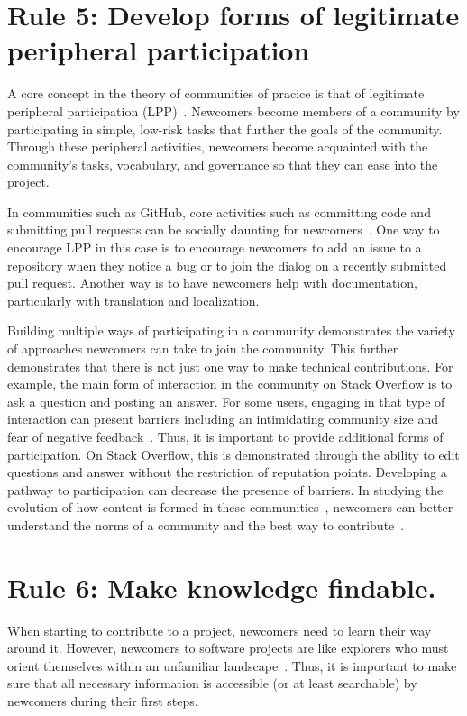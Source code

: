 \documentclass[10pt,letterpaper]{article}
\newcommand{\rulemajor}[1]{\section*{#1}}
\begin{document}
\rulemajor{Rule 5: Develop forms of legitimate peripheral participation}

A core concept in the theory of communities of pracice is that of
legitimate peripheral participation (LPP)~\cite{lave1991,wenger1999}.
Newcomers become members of a community by participating in simple, low-risk tasks
that further the goals of the community.
Through these peripheral activities,
newcomers become acquainted with the community's tasks, vocabulary, and governance
so that they can ease into the project.

In communities such as GitHub,
core activities such as committing code and submitting pull requests can be socially daunting for newcomers~\cite{steinmacher2015}.
One way to encourage LPP in this case is to encourage newcomers to add an issue to a repository when they notice a bug
or to join the dialog on a recently submitted pull request.
Another way is to have newcomers help with documentation,
particularly with translation and localization.

Building multiple ways of participating in a community demonstrates the variety of approaches newcomers can take to join the community.
This further demonstrates that there is not just one way to make technical contributions.
For example,
the main form of interaction in the community on Stack Overflow is to ask a question and posting an answer.
For some users,
engaging in that type of interaction can present barriers including an intimidating community size and fear of negative feedback~\cite{ford2016}.
Thus, it is important to provide additional forms of participation.
On Stack Overflow, this is demonstrated through the ability to edit questions and answer without the restriction of reputation points.
Developing a pathway to participation can decrease the presence of barriers.
In studying the evolution of how content is formed in these communities~\cite{baltes2018},
newcomers can better understand the norms of a community and the best way to contribute~\cite{ford2018}.

\rulemajor{Rule 6: Make knowledge findable.}

When starting to contribute to a project,
newcomers need to learn their way around it.
However,
newcomers to software projects are like explorers who must orient themselves within an unfamiliar landscape~\cite{dagenais2010}.
Thus,
it is important to make sure that all necessary information is accessible
(or at least searchable)
by newcomers during their first steps.
\end{document}
